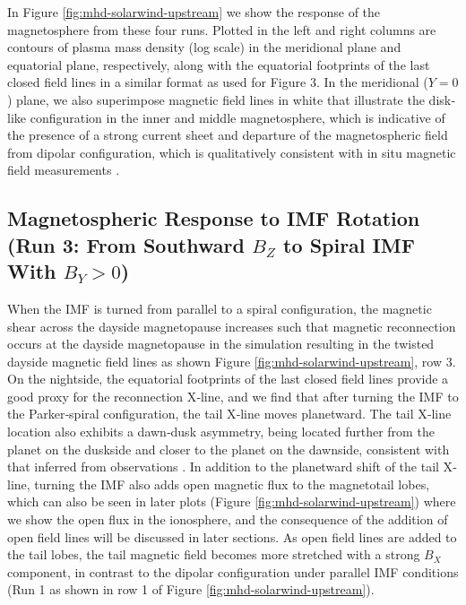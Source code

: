 In Figure \ref{fig:mhd-solarwind-upstream} we show the response of the magnetosphere from these four runs. Plotted in the left and right columns are contours of plasma mass density (log scale) in the meridional plane and equatorial plane, respectively, along with the equatorial footprints of the last closed field lines in a similar format as used for Figure 3. In the meridional ($Y = 0$) plane, we also superimpose magnetic field lines in white that illustrate the disk‐like configuration in the inner and middle magnetosphere, which is indicative of the presence of a strong current sheet and departure of the magnetospheric field from dipolar configuration, which is qualitatively consistent with in situ magnetic field measurements \cite{Khurana2001}.

\subsection{Magnetospheric Response to IMF Rotation (Run 3: From Southward \texorpdfstring{$B_Z$}{Bz} to Spiral IMF With \texorpdfstring{$B_Y > 0$}{By>0}) }

When the IMF is turned from parallel to a spiral configuration, the magnetic shear across the dayside magnetopause increases such that magnetic reconnection occurs at the dayside magnetopause in the simulation resulting in the twisted dayside magnetic field lines as shown Figure \ref{fig:mhd-solarwind-upstream}, row 3. On the nightside, the equatorial footprints of the last closed field lines provide a good proxy for the reconnection X‐line, and we find that after turning the IMF to the Parker‐spiral configuration, the tail X‐line moves planetward. The tail X‐line location also exhibits a dawn‐dusk asymmetry, being located further from the planet on the duskside and closer to the planet on the dawnside, consistent with that inferred from observations \cite{Vogt2010a,Vogt2014,Woch2002a}. In addition to the planetward shift of the tail X‐line, turning the IMF also adds open magnetic flux to the magnetotail lobes, which can also be seen in later plots (Figure \ref{fig:mhd-solarwind-upstream}) where we show the open flux in the ionosphere, and the consequence of the addition of open field lines will be discussed in later sections. As open field lines are added to the tail lobes, the tail magnetic field becomes more stretched with a strong $B_X$ component, in contrast to the dipolar configuration under parallel IMF conditions (Run 1 as shown in row 1 of Figure \ref{fig:mhd-solarwind-upstream}). 

